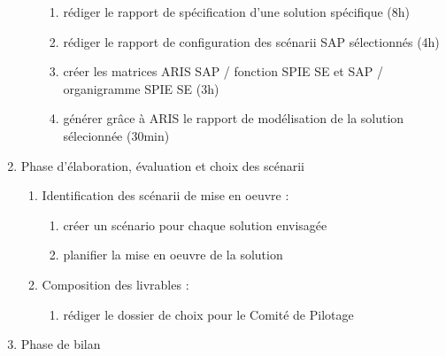 \begin{enumerate}
\begin{enumerate}
                \begin{enumerate}
                  \item rédiger le rapport de spécification d'une solution spécifique (8h)
                  \item rédiger le rapport de configuration des scénarii SAP sélectionnés (4h)
                  \item créer les matrices ARIS SAP / fonction SPIE SE et SAP / organigramme SPIE SE (3h)
                  \item générer grâce à ARIS le rapport de modélisation de la solution sélecionnée (30min)
                \end{enumerate}
          \end{enumerate}

    \item Phase d'élaboration, évaluation et choix des scénarii

          \begin{enumerate}
            \item Identification des scénarii de mise en oeuvre : 
                \begin{enumerate}
                  \item créer un scénario pour chaque solution envisagée
                  \item planifier la mise en oeuvre de la solution
                \end{enumerate}
            \item Composition des livrables : 
                \begin{enumerate}
                  \item rédiger le dossier de choix pour le Comité de Pilotage
                \end{enumerate}
          \end{enumerate}

\item Phase de bilan


\end{enumerate}

